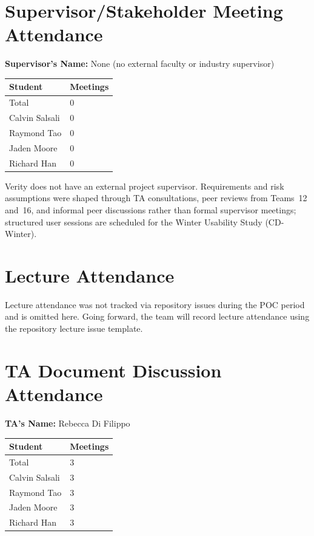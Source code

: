 \documentclass{article}
\begin{document}
\section{Supervisor/Stakeholder Meeting Attendance}

\noindent \textbf{Supervisor's Name: } None (no external faculty or industry supervisor)

\begin{table}[H]
\centering
\begin{tabular}{ll}
\toprule
\textbf{Student} & \textbf{Meetings}\\
\midrule
Total & 0\\
Calvin Salsali & 0\\
Raymond Tao & 0\\
Jaden Moore & 0\\
Richard Han & 0\\
\bottomrule
\end{tabular}
\end{table}

Verity does not have an external project supervisor. Requirements and risk assumptions were shaped through TA consultations, peer reviews from Teams~12 and~16, and informal peer discussions rather than formal supervisor meetings; structured user sessions are scheduled for the Winter Usability Study (CD-Winter).

\section{Lecture Attendance}

Lecture attendance was not tracked via repository issues during the POC period and is omitted here. Going forward, the team will record lecture attendance using the repository lecture issue template.

\section{TA Document Discussion Attendance}

\noindent \textbf{TA's Name: } Rebecca Di Filippo

\begin{table}[H]
\centering
\begin{tabular}{ll}
\toprule
\textbf{Student} & \textbf{Meetings}\\
\midrule
Total & 3\\
Calvin Salsali & 3\\
Raymond Tao & 3\\
Jaden Moore & 3\\
Richard Han & 3\\
\bottomrule
\end{tabular}
\end{table}
\end{document}
